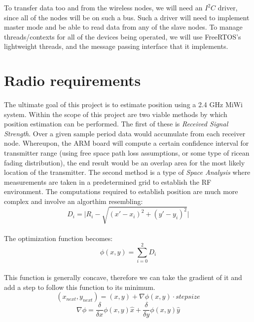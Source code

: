\documentclass{article}
\begin{document}
To transfer data too and from the wireless nodes, we will need an $I^2C$ driver,
since all of the nodes will be on such a bus.  Such a driver will need to
implement master mode and be able to read data from any of the slave nodes.  To
manage threads/contexts for all of the devices being operated, we will use
FreeRTOS's lightweight threads, and the message passing interface that it
implements.

\section*{Radio requirements}
\paragraph*{}
The ultimate goal of this project is to estimate position using a 2.4 GHz MiWi system.  Within the scope of this project are two viable methods by which position estimation can be performed.  The first of these is \textit{Received Signal Strength}.  Over a given sample period data would accumulate from each receiver node.  Whereupon, the ARM board will compute a certain confidence interval for transmitter range (using free space path loss assumptions, or some type of ricean fading distribution), the end result would be an overlap area for the most likely location of the transmitter.  The second method is a type of \textit{Space Analysis} where measurements are taken in a predetermined grid to establish the RF environment.  The computations required to establish position are much more complex and involve an algorthim resembling:
\begin{equation}
D_{i} = \vert R_{i} - \sqrt{ \left( x' - x_{i} \right)^{2} +\left( y' - y_{i} \right)^{2} } \vert
\end{equation}
\paragraph*{}The optimization function becomes:
\begin{equation}
\phi\left(x,y\right) = \sum_{i=0}^{2}D_{i}
\end{equation}
\paragraph*{}This function is generally concave, therefore we can take the gradient of it and add a step to follow this function to its minimum.
\begin{equation}
\left(x_{next},y_{next}\right) = (x,y) + \nabla\phi\left(x,y\right)\cdot stepsize
\end{equation}
\begin{equation}
\nabla\phi = \frac{\delta}{\delta x}\phi\left(x,y\right)\hat{x} + \frac{\delta}{\delta y}\phi\left(x,y\right)\hat{y}
\end{equation}
\end{document}
